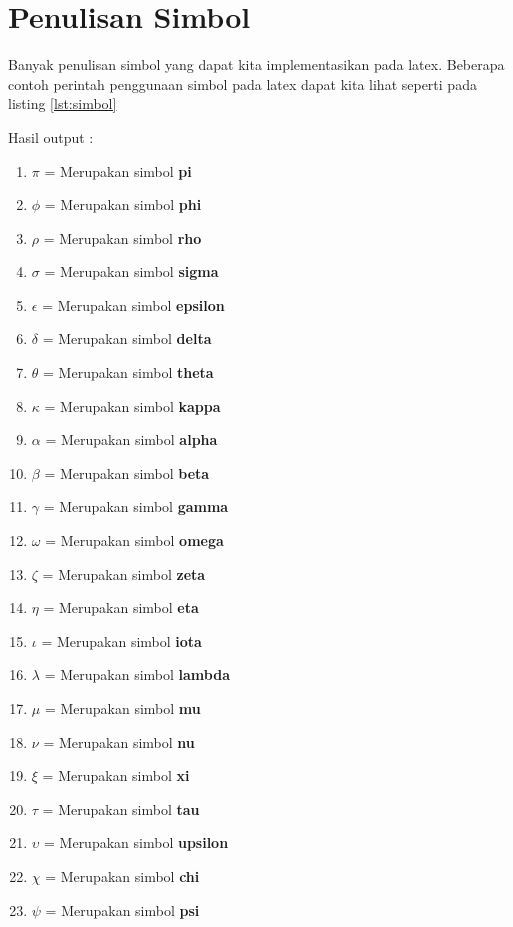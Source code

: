 \section{Penulisan Simbol}
Banyak penulisan simbol yang dapat kita implementasikan pada latex. Beberapa contoh perintah penggunaan simbol pada latex dapat kita lihat seperti pada listing \ref{lst:simbol}


Hasil output :
\begin{enumerate}
\item $\pi$ = Merupakan simbol \textbf{pi}	
\item $\phi$	= Merupakan simbol \textbf{phi}
\item $\rho$ = Merupakan simbol \textbf{rho}
\item $\sigma$ = Merupakan simbol \textbf{sigma}	
\item $\epsilon$ = Merupakan simbol \textbf{epsilon}
\item $\delta$ = Merupakan simbol \textbf{delta}	
\item $\theta$ = Merupakan simbol \textbf{theta}	
\item $\kappa$ = Merupakan simbol \textbf{kappa}	
\item $\alpha$ = Merupakan simbol \textbf{alpha}
\item $\beta$ = Merupakan simbol \textbf{beta}
\item $\gamma$ = Merupakan simbol \textbf{gamma}	
\item $\omega$ = Merupakan simbol \textbf{omega}	
\item $\zeta$ = Merupakan simbol \textbf{zeta}	
\item $\eta$	= Merupakan simbol \textbf{eta}
\item $\iota$ = Merupakan simbol \textbf{iota}	 
\item $\lambda$ = Merupakan simbol \textbf{lambda}	
\item $\mu$ = Merupakan simbol \textbf{mu}
\item $\nu$ = Merupakan simbol \textbf{nu}	
\item $\xi$ = Merupakan simbol \textbf{xi}
\item $\tau$ = Merupakan simbol \textbf{tau}
\item $\upsilon$ = Merupakan simbol \textbf{upsilon}	
\item $\chi$ = Merupakan simbol \textbf{chi}	
\item $\psi$ = Merupakan simbol \textbf{psi}
\end{enumerate}





